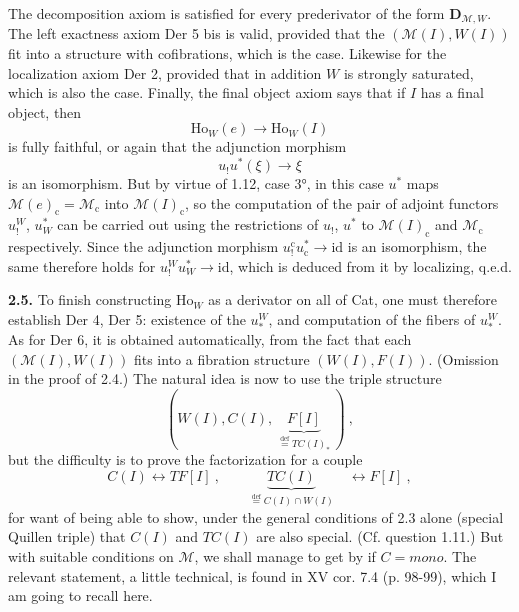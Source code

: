 \documentclass[11pt]{article}
\newcommand{\printedpage}[1]{\marginpar{\footnotesize p.~#1}}
\newcommand{\msp}[1]{\marginpar{\footnotesize [#1]}}
\newcommand{\deq}{\overset{\text{def}}{=}}
\newcommand{\Ho}{\mathrm{Ho}}
\begin{document}
\printedpage{14}

\msp{page 23}
The decomposition axiom is satisfied for every prederivator of the form $\mathbf{D}_{\mathcal{M},W}$. The left exactness axiom Der 5 bis is valid, provided that the $(\mathcal{M}(I),W(I))$ fit into a structure with cofibrations, which is the case. Likewise for the localization axiom Der 2, provided that in addition $W$ is strongly saturated, which is also the case. Finally, the final object axiom says that if $I$ has a final object, then
\[ \Ho_W(e) \longrightarrow \Ho_W(I) \]
is fully faithful, or again that the adjunction morphism
\[ u_!u^*(\xi) \longrightarrow \xi \]
is an isomorphism. But by virtue of 1.12, case 3°, in this case $u^*$ maps $\mathcal{M}(e)_{\mathrm{c}} = \mathcal{M}_{\mathrm{c}}$ into $\mathcal{M}(I)_{\mathrm{c}}$, so the computation of the pair of adjoint functors $u_!^W$, $u_W^*$ can be carried out using the restrictions of $u_!$, $u^*$ to $\mathcal{M}(I)_{\mathrm{c}}$ and $\mathcal{M}_{\mathrm{c}}$ respectively. Since the adjunction morphism $u_!^{\mathrm{c}}u_{\mathrm{c}}^* \longrightarrow \mathrm{id}$ is an isomorphism, the same therefore holds for $u_!^W u_W^* \longrightarrow \mathrm{id}$, which is deduced from it by localizing, q.e.d.

\textbf{2.5.} To finish constructing $\Ho_W$ as a derivator on all of Cat, one must \msp{page 24} therefore establish Der 4, Der 5: existence of the $u_*^W$, and computation of the fibers of $u_*^W$. As for Der 6, it is obtained automatically, from the fact that each $(\mathcal{M}(I),W(I))$ fits into a fibration structure $(W(I),F(I))$. (Omission in the proof of 2.4.) The natural idea is now to use the triple structure
\[ (W(I),C(I),\ \underbrace{F[I]}_{\deq TC(I)_*}\ )\ , \tag*{(2.5.1)} \]
but the difficulty is to prove the factorization for a couple
\[ C(I) \longleftrightarrow TF[I]\ , \qquad \underbrace{TC(I)}_{\deq C(I)\cap W(I)} \quad \longleftrightarrow F[I]\ , \tag*{(2.5.2)} \]
for want of being able to show, under the general conditions of 2.3 alone (special Quillen triple) that $C(I)$ and $TC(I)$ are also special. (Cf. question 1.11.) But with suitable conditions on $\mathcal{M}$, we shall manage to get by if $C = \mathit{mono}$. The relevant statement, a little technical, is found in XV cor. 7.4 (p. 98-99), which I am going to recall here.

\printedpage{15}
\end{document}
